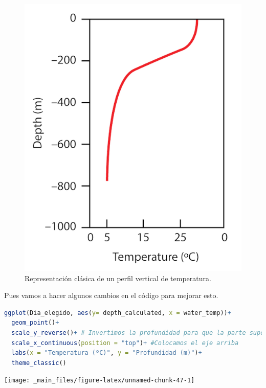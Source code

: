 \documentclass[
]{book}
\begin{document}
\begin{figure}

{\centering \includegraphics[width=1\linewidth]{Img/Perfil2} 

}

\caption{Representación clásica de un perfil vertical de temperatura.}\label{fig:unnamed-chunk-46}
\end{figure}

Pues vamos a hacer algunos cambios en el código para mejorar esto.

\begin{lstlisting}[language=R]
ggplot(Dia_elegido, aes(y= depth_calculated, x = water_temp))+
  geom_point()+
  scale_y_reverse()+ # Invertimos la profundidad para que la parte superior sea 0 metros.
  scale_x_continuous(position = "top")+ #Colocamos el eje arriba
  labs(x = "Temperatura (ºC)", y = "Profundidad (m)")+
  theme_classic()
\end{lstlisting}

\texttt{[image: \_main\_files/figure-latex/unnamed-chunk-47-1]}
\end{document}
